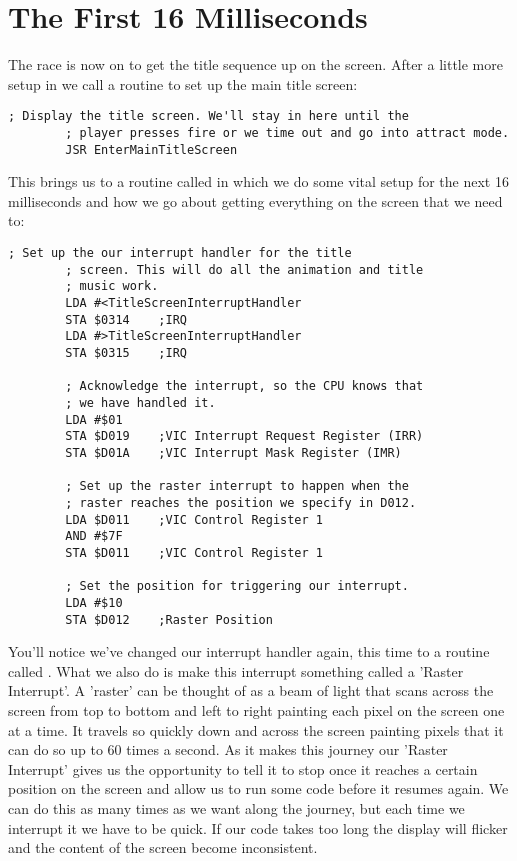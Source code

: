 \chapter{The First 16 Milliseconds} 
\label{sec:first16}
\lstset{style=6502Style}

The race is now on to get the title sequence up on the screen. After a little more setup in 
we call a routine to set up the main title screen:

\begin{lstlisting}[caption=In \icode{MainControlLoop}]
        ; Display the title screen. We'll stay in here until the
        ; player presses fire or we time out and go into attract mode.
        JSR EnterMainTitleScreen
\end{lstlisting}

This brings us to a routine called  in
which we do some vital setup for the next 16 milliseconds and how we go about getting everything
on the screen that we need to:


\begin{lstlisting}[caption=In \icode{InitializeSpritesAndInterruptsForTitleScreen}]
        ; Set up the our interrupt handler for the title
        ; screen. This will do all the animation and title
        ; music work.
        LDA #<TitleScreenInterruptHandler
        STA $0314    ;IRQ
        LDA #>TitleScreenInterruptHandler
        STA $0315    ;IRQ

        ; Acknowledge the interrupt, so the CPU knows that
        ; we have handled it.
        LDA #$01
        STA $D019    ;VIC Interrupt Request Register (IRR)
        STA $D01A    ;VIC Interrupt Mask Register (IMR)

        ; Set up the raster interrupt to happen when the
        ; raster reaches the position we specify in D012.
        LDA $D011    ;VIC Control Register 1
        AND #$7F
        STA $D011    ;VIC Control Register 1

        ; Set the position for triggering our interrupt.
        LDA #$10
        STA $D012    ;Raster Position
\end{lstlisting}

You'll notice we've changed our interrupt handler again, this time to a routine called
. What we also do is make this interrupt something
called a 'Raster Interrupt'. A 'raster' can be thought of as a beam of light that scans
across the screen from top to bottom and left to right painting each pixel on the screen
one at a time. It travels so quickly down and across the screen painting pixels that it
can do so up to 60 times a second. As it makes this journey our 'Raster Interrupt' gives
us the opportunity to tell it to stop once it reaches a certain position on the screen
and allow us to run some code before it resumes again. We can do this as many times as
we want along the journey, but each time we interrupt it we have to be quick. If our code
takes too long the display will flicker and the content of the screen become inconsistent.

